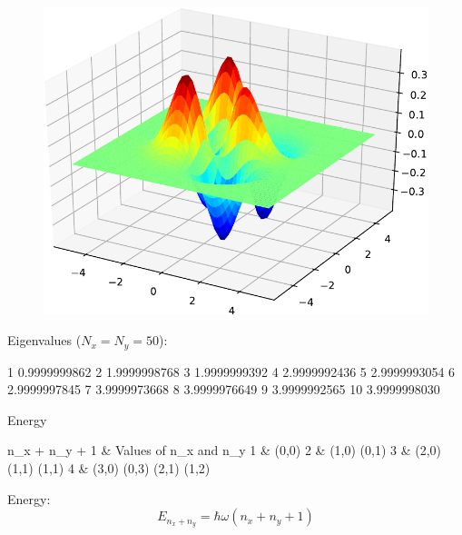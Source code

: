 \begin{figure}[H]
{\includegraphics[scale=0.3]{../codes/sch_2d/IMG_harmonic_psi_10.pdf}
\par}
\label{fig:harm_2d_eigenfunctions}
\end{figure}

Eigenvalues ($N_{x} = N_{y} = 50$):
\begin{textcode}
    1       0.9999999862
    2       1.9999998768
    3       1.9999999392
    4       2.9999992436
    5       2.9999993054
    6       2.9999997845
    7       3.9999973668
    8       3.9999976649
    9       3.9999992565
   10       3.9999998030
\end{textcode}


Energy
\begin{textcode}
n_x + n_y + 1  &  Values of n_x and n_y
1              &  (0,0)
2              &  (1,0) (0,1)
3              &  (2,0) (1,1) (1,1)
4              &  (3,0) (0,3) (2,1) (1,2)
\end{textcode}

Energy:
\begin{equation}
E_{n_{x} + n_{y}} = \hbar \omega \left( n_{x} + n_{y} + 1 \right)
\end{equation}
